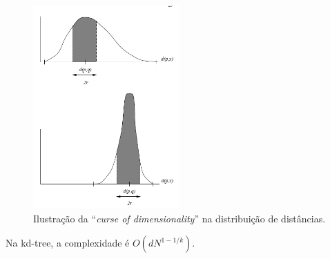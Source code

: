 \begin{figure}
    \centering
    \includegraphics[width=0.5\textwidth]{imgs/distribution_curse.png}
    \caption{Ilustração da ``\textit{curse of dimensionality}'' na distribuição de distâncias. \cite{searching:navarro2002}}
    \label{fig:distribution_curse}
\end{figure}


Na kd-tree, a complexidade é
$O(d N^{1 - 1/k})$\cite{worstcase:lee1977}.

\printbibliography